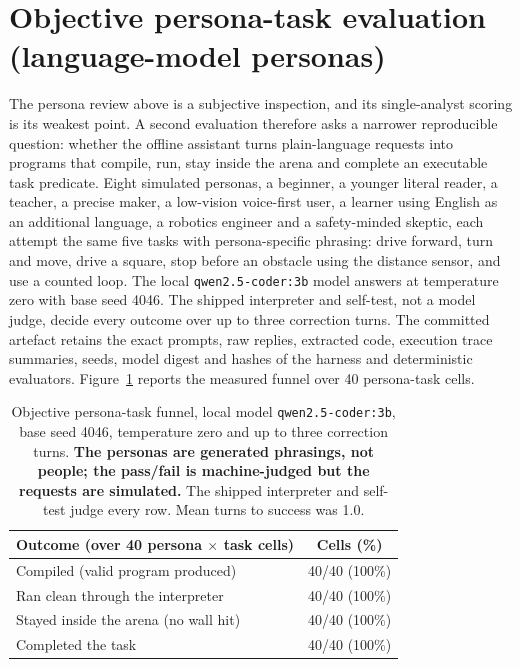 \documentclass[11pt,a4paper]{report}
\begin{document}
\section{Objective persona-task evaluation (language-model personas)}
The persona review above is a subjective inspection, and its single-analyst scoring is its weakest point. A second evaluation therefore asks a narrower reproducible question: whether the offline assistant turns plain-language requests into programs that compile, run, stay inside the arena and complete an executable task predicate. Eight simulated personas, a beginner, a younger literal reader, a teacher, a precise maker, a low-vision voice-first user, a learner using English as an additional language, a robotics engineer and a safety-minded skeptic, each attempt the same five tasks with persona-specific phrasing: drive forward, turn and move, drive a square, stop before an obstacle using the distance sensor, and use a counted loop. The local \texttt{qwen2.5-coder:3b} model answers at temperature zero with base seed 4046. The shipped interpreter and self-test, not a model judge, decide every outcome over up to three correction turns. The committed artefact retains the exact prompts, raw replies, extracted code, execution trace summaries, seeds, model digest and hashes of the harness and deterministic evaluators. Figure~\ref{tab:objeval} reports the measured funnel over 40 persona-task cells.

\begin{table}[h]
\centering\small
\renewcommand{\arraystretch}{1.2}
\begin{tabular}{lc}
\toprule
Outcome (over 40 persona $\times$ task cells) & Cells (\%) \\
\midrule
Compiled (valid program produced) & 40/40 (100\%) \\
Ran clean through the interpreter & 40/40 (100\%) \\
Stayed inside the arena (no wall hit) & 40/40 (100\%) \\
Completed the task & 40/40 (100\%) \\
\bottomrule
\end{tabular}
\caption{Objective persona-task funnel, local model \texttt{qwen2.5-coder:3b}, base seed 4046, temperature zero and up to three correction turns. \textbf{The personas are generated phrasings, not people; the pass/fail is machine-judged but the requests are simulated.} The shipped interpreter and self-test judge every row. Mean turns to success was 1.0.}
\label{tab:objeval}
\end{table}
\end{document}
